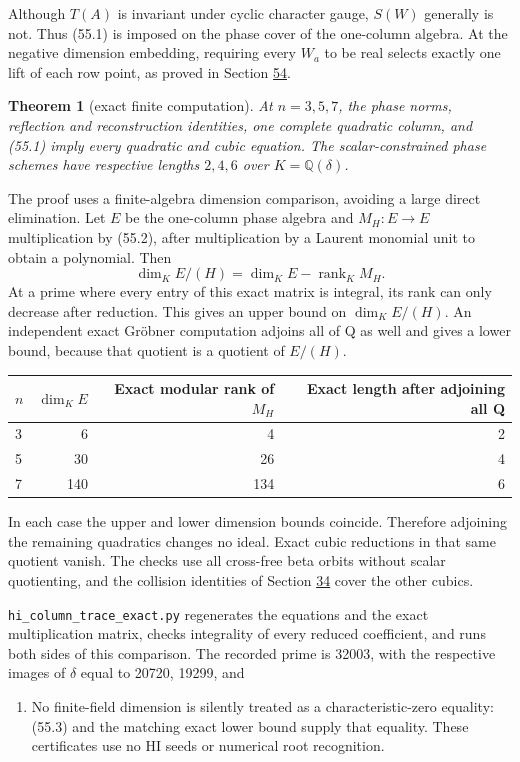 \documentclass[11pt,reqno]{amsart}
\theoremstyle{plain}
\newtheorem{theorem}{Theorem}[section]
\begin{document}
Although \(T(A)\) is invariant under cyclic character gauge,
\(S(W)\) generally is not. Thus (55.1) is imposed on the phase
cover of the one-column algebra. At the negative dimension embedding,
requiring every \(W_a\) to be real selects exactly one lift of each
row point, as proved in Section \hyperref[sec:54]{54}.

\begin{theorem}[exact finite computation]
At \(n=3,5,7\), the phase
norms, reflection and reconstruction identities, one complete quadratic
column, and (55.1) imply every quadratic and cubic equation.
The scalar-constrained phase schemes have respective lengths
\(2,4,6\) over \(K=\mathbb Q(\delta)\).
\end{theorem}

The proof uses a finite-algebra dimension comparison, avoiding a large
direct elimination. Let \(E\) be the one-column phase algebra and
\(M_H:E\to E\) multiplication by (55.2), after multiplication by a
Laurent monomial unit to obtain a polynomial. Then
\begin{equation*}
 \dim_K E/(H)=\dim_K E-\operatorname{rank}_K M_H.
 \tag{55.3}
\end{equation*}
At a prime where every entry of this exact matrix is integral, its
rank can only decrease after reduction. This gives an upper bound on
\(\dim_K E/(H)\). An independent exact Gr\"obner computation adjoins
all of Q as well and gives a lower bound, because that quotient is a
quotient of \(E/(H)\).

\begin{center}\small
\begin{tabular}{@{}lrrr@{}}
\toprule
\(n\) & \(\dim_K E\) & Exact modular rank of \(M_H\) & Exact length after adjoining all Q \\
\midrule
3 & 6 & 4 & 2 \\
5 & 30 & 26 & 4 \\
7 & 140 & 134 & 6 \\
\bottomrule
\end{tabular}
\end{center}

In each case the upper and lower dimension bounds coincide. Therefore
adjoining the remaining quadratics changes no ideal. Exact cubic
reductions in that same quotient vanish. The checks use all cross-free
beta orbits without scalar quotienting, and the collision identities
of Section \hyperref[sec:34]{34} cover the other cubics.

\texttt{hi\_\allowbreak column\_\allowbreak trace\_\allowbreak exact.py} regenerates the equations and the exact
multiplication matrix, checks integrality of every reduced coefficient,
and runs both sides of this comparison. The recorded prime is 32003,
with the respective images of \(\delta\) equal to 20720, 19299, and
\begin{enumerate}
\item No finite-field dimension is silently treated as a
characteristic-zero equality: (55.3) and the matching exact lower
bound supply that equality. These certificates use no HI seeds or
numerical root recognition.
\end{enumerate}
\end{document}
